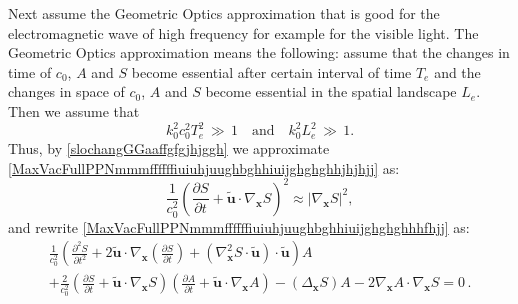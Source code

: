 \documentclass{article}
\theoremstyle{definition}
\theoremstyle{remark}
\renewcommand{\vec}[1]{\mathbf{#1}}
\newcommand{\er}{\eqref}
\newcommand{\er}{\eqref}
\begin{document}
Next assume the Geometric Optics approximation that is good for the
electromagnetic wave of high frequency for example for the visible
light. The Geometric Optics approximation means the following:
assume that the changes in time of $c_0$, $A$ and $S$ become
essential after certain interval of time $T_e$ and the changes in
space of $c_0$, $A$ and $S$ become essential in the spatial
landscape $L_e$. Then we assume that
\begin{equation}\label{slochangGGaaffgfgjhjggh}
k^2_0c^2_0T^2_e\,\gg\, 1\quad\text{and}\quad k^2_0L^2_e\,\gg\, 1.
\end{equation}
Thus, by
\er{slochangGGaaffgfgjhjggh} we approximate
\er{MaxVacFullPPNmmmffffffiuiuhjuughbghhiuijghghghhjhjhjj} as:
\begin{equation}\label{MaxVacFullPPNmmmffffffiuiuhjuughbghhiuijghghghhjhjhhghyuyjj}
\frac{1}{c^2_0}\left(\frac{\partial S}{\partial t}+\vec {\tilde
u}\cdot\nabla_\vec x S\right)^2\approx\left|\nabla_\vec x
S\right|^2,
\end{equation}
and rewrite
\er{MaxVacFullPPNmmmffffffiuiuhjuughbghhiuijghghghhhfhjj} as:
\begin{multline}\label{MaxVacFullPPNmmmffffffiuiuhjuughbghhiuijghghghhhfhhghghguygtjj}
\frac{1}{c^2_0}\left(\frac{\partial^2 S}{\partial t^2}+2\vec {\tilde
u}\cdot \nabla_{\vec x}\left(\frac{\partial S}{\partial
t}\right)+\left(\nabla^2_{\vec x}S\cdot\vec {\tilde
u}\right)\cdot\vec {\tilde
u}\right)A\\+\frac{2}{c^2_0}\left(\frac{\partial S}{\partial t}+\vec
{\tilde u}\cdot\nabla_{\vec x}S\right)\left(\frac{\partial
A}{\partial t}+\vec {\tilde u}\cdot\nabla_{\vec
x}A\right)-\left(\Delta_{\vec
x}S\right)A-2\nabla_{\vec x}A\cdot\nabla_{\vec x}S=0\,.
\end{multline}
%
%
%
\begin{comment}
\begin{multline}\label{MaxVacFullPPNmmmffffffiuiuhjuughbghhiuijghghghhhfhhghghguygtjj}
\\
%
%
%
\frac{1}{c^2_0}\left(\frac{\partial^2 S}{\partial
t^2}\right)A+\frac{2}{c^2_0}\frac{\partial A}{\partial
t}\frac{\partial S}{\partial t}+\frac{2 }{c^2_0}\left(\vec {\tilde
u}\cdot \nabla_{\vec x}\left(\frac{\partial S}{\partial
t}\right)\right)A+\frac{2}{c^2_0}\left(\vec {\tilde
u}\cdot\nabla_{\vec x}A\right)\frac{\partial S}{\partial
t}+\frac{2}{c^2_0}\left(\vec {\tilde u}\cdot\nabla_{\vec
x}S\right)\frac{\partial A}{\partial
t}\\+\frac{1}{c^2_0}\left(\left(\nabla^2_{\vec x}S\cdot\vec {\tilde
u}\right)\cdot\vec {\tilde u}\right)A+\frac{2}{c^2_0}\left(\vec
{\tilde u}\cdot\nabla_{\vec x}A\right)\left(\vec {\tilde
u}\cdot\nabla_{\vec x}S\right)-\left(\Delta_{\vec
x}S\right)A-2\nabla_{\vec x}A\cdot\nabla_{\vec x}S=0\,.
\end{multline}
\end{comment}
\end{document}
